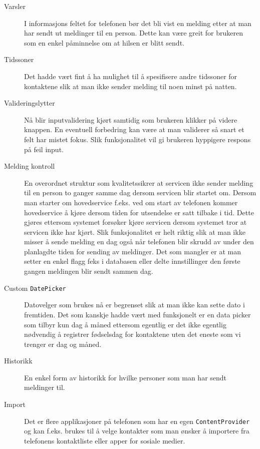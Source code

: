 \begin{description}
\item[Varsler]
I informasjons feltet for telefonen bør det bli vist en melding etter at man har sendt ut meldinger til en person. Dette kan være greit for brukeren som en enkel påminnelse om at hilsen er blitt sendt.

\item[Tidssoner]
Det hadde vært fint å ha mulighet til å spesifisere andre tidssoner for kontaktene slik at man ikke sender melding til noen minst på natten.

\item[Valideringslytter]
Nå blir inputvalidering kjørt samtidig som brukeren klikker på videre knappen. En eventuell forbedring kan være at man validerer så snart et felt har mistet fokus. Slik funksjonalitet vil gi brukeren hyppigere respons på feil input. 

\item[Melding kontroll]
En overordnet struktur som kvalitetssikrer at servicen ikke sender melding til en person to ganger samme dag dersom servicen blir startet om. Dersom man starter om hovedservice f.eks. ved om start av telefonen kommer hovedservice å kjøre dersom tiden for utsendelse er satt tilbake i tid. Dette gjøres ettersom systemet forsøker kjøre servicen dersom systemet tror at servicen ikke har kjørt. Slik funksjonalitet er helt riktig slik at man ikke misser å sende melding en dag også når telefonen blir skrudd av under den planlagdte tiden for sending av meldinger. Det som mangler er at man setter en enkel flagg feks i databasen eller delte innstillinger den første gangen meldingen blir sendt sammen dag.


\item[Custom \texttt{DatePicker}]
Datovelger som brukes nå er begrenset slik at man ikke kan sette dato i fremtiden. Det som kanskje hadde vært med funksjonelt er en data picker som tilbyr kun dag å måned ettersom egentlig er det ikke egentlig nødvendig å registrer fødselsdag for kontaktene uten det eneste som vi trenger er dag og måned.

\item[Historikk]
En enkel form av historikk for hvilke personer som man har sendt meldinger til. 

\item[Import]
Det er flere applikasjoner på telefonen som har en egen \texttt{ContentProvider} og kan f.eks. brukes til å velge kontakter som man ønsker å importere fra telefonens kontaktliste eller apper for sosiale medier.

\end{description}


